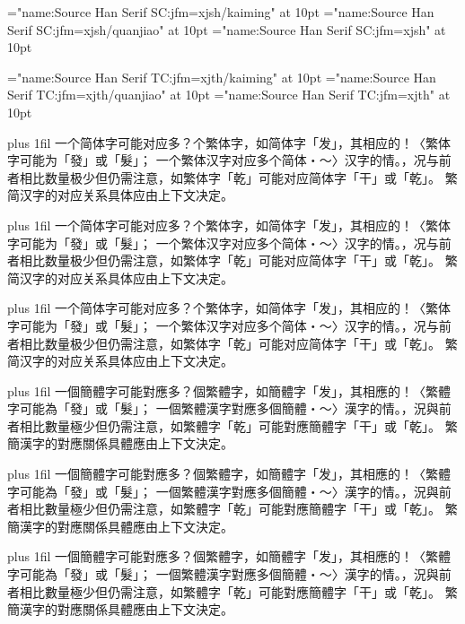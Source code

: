 

\jfont \jSK="name:Source Han Serif SC:jfm=xjsh/kaiming" at 10pt
\jfont \jSQ="name:Source Han Serif SC:jfm=xjsh/quanjiao" at 10pt
\jfont \jSB="name:Source Han Serif SC:jfm=xjsh" at 10pt

\jfont \jTK="name:Source Han Serif TC:jfm=xjth/kaiming" at 10pt
\jfont \jTQ="name:Source Han Serif TC:jfm=xjth/quanjiao" at 10pt
\jfont \jTB="name:Source Han Serif TC:jfm=xjth" at 10pt

\parindent=10pt
\hsize=250pt

\def\testS#1{\par\noindent{\tentt\string#1}\par{#1\rightskip0pt plus 1fil
  一个简体字可能对应多？个繁体字，如简体字「发」，其相应的！〈繁体字可能为「發」或「髮」；
  一个繁体汉字对应多个简体・〜〉汉字的情。，况与前者相比数量极少但仍需注意，如繁体字「乾」可能对应简体字「干」或「乾」。
  繁简汉字的对应关系具体应由上下文决定。\par}\medskip}

\def\testT#1{\par\noindent{\tentt\string#1}\par{#1\rightskip0pt plus 1fil
  一個簡體字可能對應多？個繁體字，如簡體字「发」，其相應的！〈繁體字可能為「發」或「髮」；
  一個繁體漢字對應多個簡體・〜〉漢字的情。，況與前者相比數量極少但仍需注意，如繁體字「乾」可能對應簡體字「干」或「乾」。
  繁簡漢字的對應關係具體應由上下文決定。\par}\medskip}



\testS\jSK
\testS\jSQ
\testS\jSB

\testT\jTK
\testT\jTQ
\testT\jTB
\bye
